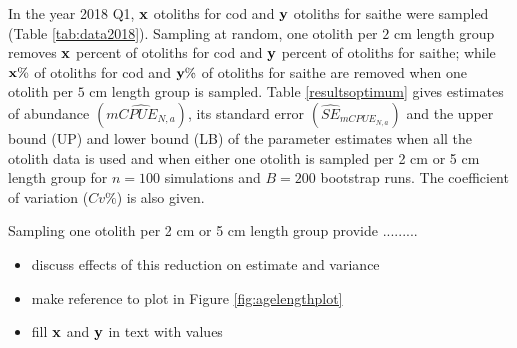 \documentclass[a4paper 12pt]{article}
\numberwithin{equation}{section}
\begin{document}
In the year 2018 Q1, ${\bf x}$ otoliths for cod and ${\bf y}$ otoliths for saithe were sampled (Table \ref{tab:data2018}). Sampling at random, one otolith per $2$ cm length group removes ${\bf x}$ percent of otoliths for cod and ${\bf y}$ percent of otoliths for saithe; while ${\bf x \%}$ of otoliths  for cod and ${\bf y \%}$  of otoliths for saithe are removed when one otolith per $5$ cm length group is sampled. Table \ref{resultsoptimum} gives estimates of abundance $\left(\widehat{mCPUE_{N,a}}\right)$, its standard error $\left(\widehat{SE}_{mCPUE_{N,a}} \right)$ and the upper bound (UP) and lower bound (LB) of the parameter estimates when all the otolith data is used and when either one otolith is sampled per 2 cm or 5 cm length group for  $n = 100$ simulations and $B = 200$ bootstrap runs. The coefficient of variation ($Cv \%$) is also given.

Sampling one otolith per 2 cm or 5 cm length group provide .........

\begin{itemize}
\item discuss effects of this reduction on estimate and variance
\item make reference to plot in Figure \ref{fig:agelengthplot}
\item fill ${\bf x}$  and ${\bf y}$ in text with values 
\end{itemize}
\end{document}
